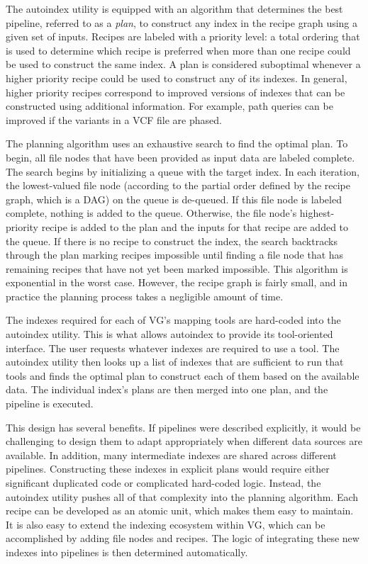 \documentclass[11pt]{ucthesis}
\begin{document}
The autoindex utility is equipped with an algorithm that determines the best pipeline, referred to as a \emph{plan}, to construct any index in the recipe graph using a given set of inputs. Recipes are labeled with a priority level: a total ordering that is used to determine which recipe is preferred when more than one recipe could be used to construct the same index. A plan is considered suboptimal whenever a higher priority recipe could be used to construct any of its indexes. In general, higher priority recipes correspond to improved versions of indexes that can be constructed using additional information. For example, path queries can be improved if the variants in a VCF file are phased\cite{siren2020haplotype}. 

The planning algorithm uses an exhaustive search to find the optimal plan. To begin, all file nodes that have been provided as input data are labeled complete. The search begins by initializing a queue with the target index. In each iteration, the lowest-valued file node (according to the partial order defined by the recipe graph, which is a DAG) on the queue is de-queued. If this file node is labeled complete, nothing is added to the queue. Otherwise, the file node's highest-priority recipe is added to the plan and the inputs for that recipe are added to the queue. If there is no recipe to construct the index, the search backtracks through the plan marking recipes impossible until finding a file node that has remaining recipes that have not yet been marked impossible. This algorithm is exponential in the worst case. However, the recipe graph is fairly small, and in practice the planning process takes a negligible amount of time.

The indexes required for each of VG's mapping tools are hard-coded into the autoindex utility. This is what allows autoindex to provide its tool-oriented interface. The user requests whatever indexes are required to use a tool. The autoindex utility then looks up a list of indexes that are sufficient to run that tools and finds the optimal plan to construct each of them based on the available data. The individual index's plans are then merged into one plan, and the pipeline is executed. 

This design has several benefits. If pipelines were described explicitly, it would be challenging to design them to adapt appropriately when different data sources are available. In addition, many intermediate indexes are shared across different pipelines. Constructing these indexes in explicit plans would require either significant duplicated code or complicated hard-coded logic. Instead, the autoindex utility pushes all of that complexity into the planning algorithm. Each recipe can be developed as an atomic unit, which makes them easy to maintain. It is also easy to extend the indexing ecosystem within VG, which can be accomplished by adding file nodes and recipes. The logic of integrating these new indexes into pipelines is then determined automatically.
\end{document}
